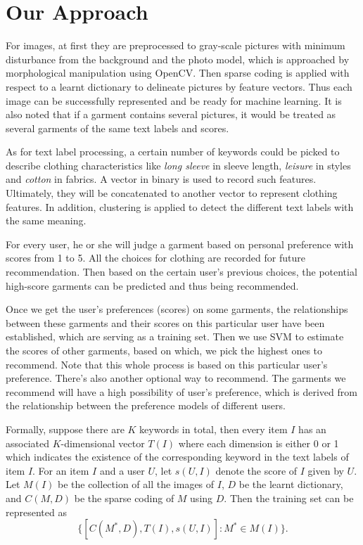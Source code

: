 \section{Our Approach}\label{sec:approach}

For images, at first they are preprocessed to gray-scale 
  pictures with minimum disturbance from the background 
  and the photo model, which is approached by morphological 
  manipulation using OpenCV. 
Then sparse coding is applied with respect to a learnt dictionary  
  to delineate pictures by feature vectors. 
Thus each image can be successfully represented and be ready for machine learning. 
It is also noted that if a garment contains several pictures, 
  it would be treated as several garments of the same text labels and scores.

As for text label processing, a certain number of keywords 
  could be picked to describe clothing characteristics like 
  \emph{long sleeve} in sleeve length, 
  \emph{leisure} in styles and 
  \emph{cotton} in fabrics. 
A vector in binary is used to record such features. 
Ultimately, they will be concatenated to another vector to represent clothing features. 
In addition, clustering is applied to detect the different text labels with the same meaning.

For every user, he or she will judge a garment based on personal 
  preference with scores from 1 to 5. 
All the choices for clothing are recorded for future recommendation. 
Then based on the certain user's previous choices, the potential 
  high-score garments can be predicted and thus being recommended.

Once we get the user's preferences (scores) on some garments, 
  the relationships between these garments and their scores on this
  particular user have been established, which are serving as a training set. 
Then we use SVM to estimate the scores of other garments, based on which, 
  we pick the highest ones to recommend. 
Note that this whole process is based on this particular user's preference.
There's also another optional way to recommend. 
The garments we recommend will have a high possibility of user's preference, 
  which is derived from the relationship between the preference models of different users.

Formally, suppose there are $K$ keywords in total, then every item $I$ has an associated 
  $K$-dimensional vector $T(I)$ where each dimension is either 0 or 1 which indicates the 
  existence of the corresponding keyword in the text labels of item $I$.
For an item $I$ and a user $U$, let $s(U,I)$ denote the score of $I$ given by $U$. 
Let $M(I)$ be the collection of all the images of $I$, $D$ be the learnt dictionary, and
  $C(M,D)$ be the sparse coding of $M$ using $D$.
Then the training set can be represented as $$ \{ [C(M^*,D), T(I), s(U,I)] : M^* \in M(I) \} .$$
